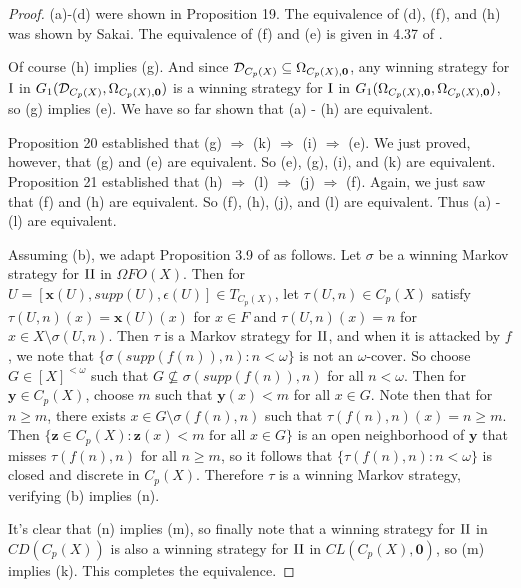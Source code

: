 \documentclass{amsart}
\theoremstyle{plain}
\theoremstyle{definition}
\theoremstyle{remark}
\theoremstyle{plain}
\theoremstyle{definition}
\theoremstyle{remark}
\begin{document}
\begin{proof}
 (a)-(d) were shown in Proposition 19.
 The equivalence of (d), (f), and (h) was shown by Sakai\cite{Sakai}.
 The equivalence of (f) and (e) is given in 4.37 of \cite{CombOpenCovers}.

 Of course (h) implies (g). And since \(\mathcal{D}_{C_p(X)}\subseteq\Omega_{C_p(X),\mathbf 0}\), any winning strategy for \(\mathrm{I}\) in \(G_{1}(\mathcal{D}_{C_p(X)},\Omega_{C_p(X),\mathbf 0})\) is a winning strategy for \(\mathrm{I}\) in \(G_{1}(\Omega_{C_p(X),\mathbf 0},\Omega_{C_p(X),\mathbf 0})\), so (g) implies (e). 
 We have so far shown that (a) - (h) are equivalent.

 Proposition 20 established that (g) \(\Rightarrow\) (k) \(\Rightarrow\) (i) \(\Rightarrow\) (e).
 We just proved, however, that (g) and (e) are equivalent.
 So (e), (g), (i), and (k) are equivalent.
 Proposition 21 established that (h) \(\Rightarrow\) (l) \(\Rightarrow\) (j) \(\Rightarrow\) (f).
 Again, we just saw that (f) and (h) are equivalent.
 So (f), (h), (j), and (l) are equivalent.
 Thus (a) - (l) are equivalent.

 Assuming (b), we adapt Proposition 3.9 of \cite{Tkachuk3} as follows.
 Let \(\sigma\) be a winning Markov strategy for \(\mathrm{II}\) in \(\Omega FO(X)\). 
 Then for \(U=[\mathbf x(U),supp(U),\epsilon(U)]\in T_{C_p(X)}\), let \(\tau(U,n)\in C_p(X)\) satisfy  \(\tau(U,n)(x)=\mathbf x(U)(x)\) for \(x\in F\) and \(\tau(U,n)(x)=n\) for \(x\in X\setminus\sigma(U,n)\). 
 Then \(\tau\) is a Markov strategy for \(\mathrm{II}\), and when it is attacked by \(f\), we note that \(\{\sigma(supp(f(n)),n):n<\omega\}\) is not an \(\omega\)-cover. 
 So choose \(G\in[X]^{<\omega}\) such that \(G\not\subseteq\sigma(supp(f(n)),n)\) for all \(n<\omega\). 
 Then for \(\mathbf y\in C_p(X)\), choose \(m\) such that \(\mathbf y(x)<m\) for all \(x\in G\). 
 Note then that for \(n\geq m\), there exists \(x\in G\setminus\sigma(f(n),n)\) such that \(\tau(f(n),n)(x)=n\geq m\). 
 Then \(\{\mathbf z\in C_p(X):\mathbf z(x)<m\text{ for all }x\in G\}\) is an open neighborhood of \(\mathbf y\) that misses \(\tau(f(n),n)\) for all \(n\geq m\), so it follows that \(\{\tau(f(n),n):n<\omega\}\) is closed and discrete in \(C_p(X)\). 
 Therefore \(\tau\) is a winning Markov strategy, verifying (b) implies (n).

 It's clear that (n) implies (m), so finally note that a winning strategy for \(\mathrm{II}\) in \(CD(C_p(X))\) is also a winning strategy for \(\mathrm{II}\) in \(CL(C_p(X),\mathbf 0)\), so (m) implies (k).
 This completes the equivalence.
\end{proof}
\end{document}
